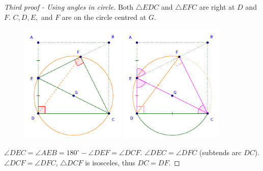 \documentclass{article}
\begin{document}
\begin{proof}[Third proof - Using angles in circle]
    Both $\triangle EDC$ and $\triangle EFC$ are right at $D$ and $F.$
    $C, D, E,$ and $F$ are on the circle centred at $G.$

    \begin{figure}[h]
        \centering
        \begin{minipage}[t]{8cm}
            \centering
            \includegraphics[width=5cm]{./svg/pdf/2022-2-ms-1-1-f.pdf}
        \end{minipage}
        \quad
        \begin{minipage}[t]{8cm}
            \centering
            \includegraphics[width=5cm]{./svg/pdf/2022-2-ms-1-1-g.pdf}
        \end{minipage}
    \end{figure}

    $\angle DEC = \angle AEB = 180^{\circ} - \angle DEF = \angle DCF.$ 
    $\angle DEC = \angle DFC$ (subtends arc $DC$).
    $\angle DCF = \angle DFC$, $\triangle DCF$ is isosceles, thus $DC = DF.$
\end{proof}

\newpage
\end{document}
